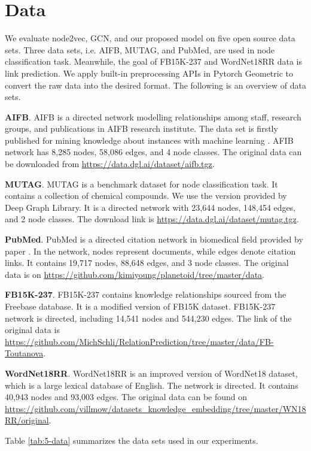 \documentclass[sigconf]{acmart}
\begin{document}
\section{Data}
We evaluate node2vec, GCN, and our proposed model on five open source data sets. Three data sets, i.e. AIFB, MUTAG, and PubMed, are used in node classification task. Meanwhile, the goal of FB15K-237 and WordNet18RR data is link prediction. We apply built-in preprocessing APIs in Pytorch Geometric to convert the raw data into the desired format. The following is an overview of data sets.\par
\vspace{0.2cm}
\noindent\textbf{AIFB}. AIFB is a directed network modelling relationships among staff, research groups, and publications in AIFB research institute. The data set is firstly published for mining knowledge about instances with machine learning \cite{aifb}. AFIB network has 8,285 nodes, 58,086 edges, and 4 node classes. The original data can be downloaded from \url{https://data.dgl.ai/dataset/aifb.tgz}.\par
\vspace{0.2cm}
\noindent\textbf{MUTAG}. MUTAG is a benchmark dataset for node classification task. It contains a collection of chemical compounds. We use the version provided by Deep Graph Library. It is a directed network with 23,644 nodes, 148,454 edges, and 2 node classes. The download link is \url{https://data.dgl.ai/dataset/mutag.tgz}.\par
\vspace{0.2cm}
\noindent\textbf{PubMed}. PubMed is a directed citation network in biomedical field provided by paper \cite{pubmed}. In the network, nodes represent documents, while edges denote citation links. It contains 19,717 nodes, 88,648 edges, and 3 node classes. The original data is on \url{https://github.com/kimiyoung/planetoid/tree/master/data}.\par
\vspace{0.2cm}
\noindent\textbf{FB15K-237}. FB15K-237 contains knowledge relationships sourced from the Freebase database. It is a modified version of FB15K dataset. FB15K-237 network is directed, including 14,541 nodes and 544,230 edges. The link of the original data is \url{https://github.com/MichSchli/RelationPrediction/tree/master/data/FB-Toutanova}.\par
\vspace{0.2cm}
\noindent\textbf{WordNet18RR}. WordNet18RR is an improved version of WordNet18 dataset, which is a large lexical database of English. The network is directed. It contains 40,943 nodes and 93,003 edges. The original data can be found on \url{https://github.com/villmow/datasets_knowledge_embedding/tree/master/WN18RR/original}.\par
\vspace{0.2cm}
Table \ref{tab:5-data} summarizes the data sets used in our experiments.
\end{document}
